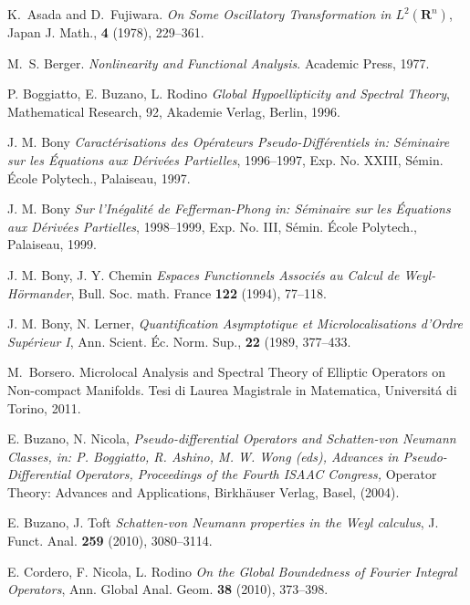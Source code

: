 \documentclass[12pt,a4paper,reqno]{amsart}
\numberwithin{equation}{section}
\numberwithin{thm}{section}
\theoremstyle{definition}
\theoremstyle{remark}
\begin{document}
\begin{thebibliography}{150}

K.~Asada and D.~Fujiwara.
\emph{On Some Oscillatory Transformation in $L^2({\mathbf R^{{n}}})$},
Japan J. Math., \textbf{4} (1978), 229--361.

M.~S. Berger.
\newblock \emph{Nonlinearity and Functional Analysis}.
\newblock Academic Press, 1977.

 P. Boggiatto, E. Buzano, L. Rodino \emph{Global
Hypoellipticity and Spectral Theory},  Mathematical Research, 92,
Akademie Verlag, Berlin, 1996.

 {J. M. Bony} \emph{Caract{\'e}risations des
Op{\'e}rateurs Pseudo-Diff{\'e}rentiels  \rm{in: S{\'e}\-mi\-nai\-re
sur les {\'E}quations aux D{\'e}riv{\'e}es Partielles}}, 1996--1997,
Exp. No. XXIII, S{\'e}min. {\'E}cole Polytech., Palaiseau, 1997. 

 {J. M. Bony} \emph{Sur l'In\'egalit\'e de
Fefferman-Phong \rm{in: S\'eminaire sur les  \'Equations aux
D\'eriv\'ees Partielles}}, 1998--1999, Exp. No. III, S\'emin. \'Ecole
Polytech., Palaiseau, 1999. 

 {J. M. Bony, J. Y. Chemin} \emph{Espaces Functionnels
Associ\'es au Calcul de Weyl-H{\"o}rmander}, Bull. Soc. math. France
\textbf{122} (1994), 77--118. 

 {J. M. Bony, N. Lerner,} \emph{Quantification
Asymptotique et Microlocalisations d'Ordre Su\-p\'e\-rieur I},
Ann. Scient. \'Ec. Norm. Sup., \textbf{22} (1989, 377--433. 

M.~Borsero.
\newblock Microlocal Analysis and Spectral Theory
of Elliptic Operators on Non-compact Manifolds.
\newblock Tesi di Laurea Magistrale in Matematica, Universit{\'a}
di Torino, 2011.

 {E. Buzano, N. Nicola,} \emph{Pseudo-differential
Operators and Schatten-von Neumann Classes, \rm{in: P. Boggiatto,
R. Ashino, M. W. Wong (eds),} Advances in Pseudo-Differential
Operators, Proceedings of the Fourth ISAAC Congress,} Operator
Theory: Advances and Applications, Birkh{\"a}user Verlag, Basel, 
(2004).

 E. Buzano, J. Toft \emph{Schatten-von Neumann properties in
the Weyl calculus}, J. Funct. Anal. \textbf{259} (2010), 3080--3114. 

 E. Cordero, F. Nicola, L. Rodino \emph{On the Global
Boundedness of Fourier Integral Operators}, Ann. Global Anal. Geom.
\textbf{38} (2010), 373--398.


\end{thebibliography}
\end{document}
